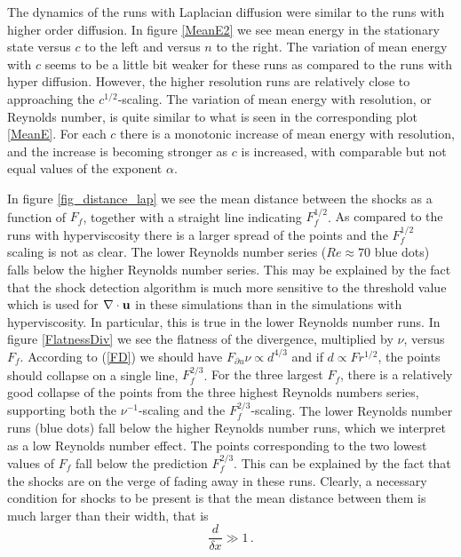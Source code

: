 The dynamics of the runs with Laplacian diffusion were similar to the runs with higher order diffusion. In figure \ref{MeanE2} we see mean energy in the stationary state versus $ c $ to the left and versus $ n $ to the right. 
The variation of mean energy with $ c $ seems to be a little bit weaker for these runs as compared to the runs with hyper diffusion.  { However, the higher resolution runs are relatively close to approaching the $ c^{1/2} $-scaling.}
The variation of mean energy with resolution, or Reynolds number, is quite similar to what is seen in the corresponding plot \ref{MeanE}. For each $ c $ there is a monotonic increase of mean energy with resolution, and the increase is becoming stronger as $ c $ is increased, with comparable but not equal values of the exponent $ \alpha $.  


In figure \ref{fig_distance_lap} we see the mean distance between the shocks as a function of $ F_f $, together with a straight line indicating $ F_f^{1/2} $. { As compared to the runs with hyperviscosity there is a larger spread of the points and the $ F_f^{1/2} $ scaling is not as clear. The lower Reynolds number series ($ Re \approx 70 $ blue dots) falls below the higher Reynolds number series. This may be explained by the fact that the shock detection algorithm is much more sensitive to the threshold value which is used for $ \nabla \cdot {\bf u} $ in these simulations than in the simulations with hyperviscosity.  In particular, this is true in the lower Reynolds number runs. } In figure \ref{FlatnessDiv} we see the flatness of the divergence, multiplied by $ \nu $, versus $ F_f $. According to (\ref{FD}) we should have $ F_{\partial u} \nu \propto  d^{4/3} $ and if $ d \propto Fr^{1/2} $, the points should collapse on a single line, $ F_f^{2/3} $.  {For the three largest $ F_f $, there is a relatively good collapse of the points from the three highest  Reynolds numbers series, supporting both the $ \nu^{-1} $-scaling and the $ F_f^{2/3} $-scaling. }
 The lower Reynolds number runs (blue dots) fall below the higher Reynolds number runs, which we interpret as a low Reynolds number effect. The points corresponding to the two lowest values of $ F_f $ fall below the prediction $ F_f^{2/3} $. This can be explained by the fact that the shocks are on the verge of fading away in these runs. Clearly, a necessary condition for shocks to be present is that the mean distance between them is much larger than their  width, that is
\begin{equation} \label{Condition} 
\frac{d}{\delta x} \gg  1\, .
\end{equation} 
